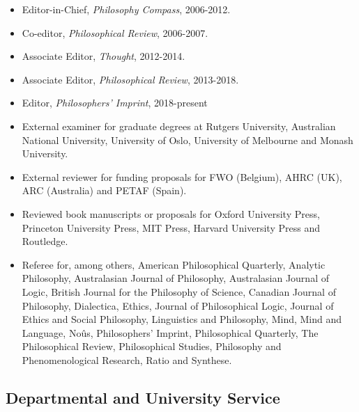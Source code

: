 \documentclass[
  10pt,
  letterpaper,
  DIV=11,
  numbers=noendperiod,
  twoside]{scrartcl}
\providecommand{\tightlist}{%
  \setlength{\itemsep}{0pt}\setlength{\parskip}{0pt}}
\begin{document}
\begin{itemize}
\tightlist
\item
  Editor-in-Chief, \emph{Philosophy Compass}, 2006-2012.
\item
  Co-editor, \emph{Philosophical Review}, 2006-2007.
\item
  Associate Editor, \emph{Thought}, 2012-2014.
\item
  Associate Editor, \emph{Philosophical Review}, 2013-2018.
\item
  Editor, \emph{Philosophers' Imprint}, 2018-present
\item
  External examiner for graduate degrees at Rutgers University,
  Australian National University, University of Oslo, University of
  Melbourne and Monash University.
\item
  External reviewer for funding proposals for FWO (Belgium), AHRC (UK),
  ARC (Australia) and PETAF (Spain).
\item
  Reviewed book manuscripts or proposals for Oxford University Press,
  Princeton University Press, MIT Press, Harvard University Press and
  Routledge.
\item
  Referee for, among others, American Philosophical Quarterly, Analytic
  Philosophy, Australasian Journal of Philosophy, Australasian Journal
  of Logic, British Journal for the Philosophy of Science, Canadian
  Journal of Philosophy, Dialectica, Ethics, Journal of Philosophical
  Logic, Journal of Ethics and Social Philosophy, Linguistics and
  Philosophy, Mind, Mind and Language, Noûs, Philosophers' Imprint,
  Philosophical Quarterly, The Philosophical Review, Philosophical
  Studies, Philosophy and Phenomenological Research, Ratio and Synthese.
\end{itemize}

\subsection{Departmental and University
Service}\label{departmental-and-university-service}
\end{document}

